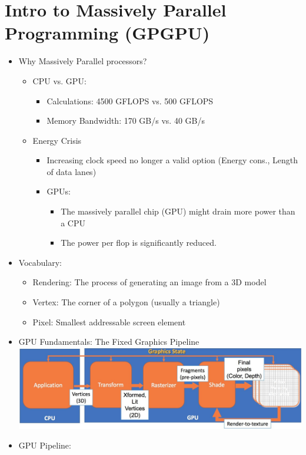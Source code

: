 \documentclass[a4paper]{article}
\begin{document}
\section{Intro to Massively Parallel Programming (GPGPU)}
\begin{itemize}
\item Why Massively Parallel processors?
\begin{itemize}
\item CPU vs. GPU:
\begin{itemize}
\item Calculations: 4500 GFLOPS vs. 500 GFLOPS
\item Memory Bandwidth: 170 GB/s vs. 40 GB/s
\end{itemize}
\item Energy Crisis
\begin{itemize}
\item Increasing clock speed no longer a valid option (Energy cons., Length of data lanes)
\item GPUs:
\begin{itemize}
\item The massively parallel chip (GPU) might drain more power than a CPU
\item The power per flop is significantly reduced. 
\end{itemize}
\end{itemize}
\end{itemize}
\item Vocabulary:
\begin{itemize}
\item Rendering: The process of generating an image from a 3D model
\item Vertex: The corner of a polygon (usually a triangle)
\item Pixel: Smallest addressable screen element
\end{itemize}
\item GPU Fundamentals: The Fixed Graphics Pipeline\\\includegraphics[scale=0.205]{Figures/fixedGraphicsPipeline.jpg}
\item GPU Pipeline: 

\end{itemize}
\end{document}
